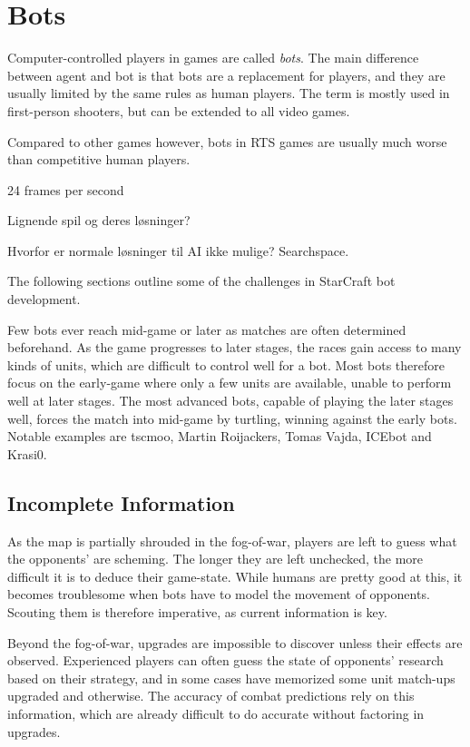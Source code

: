 \section{Bots}
Computer-controlled players in games are called \emph{bots}. The main difference between agent and bot is that bots are a replacement for players, and they are usually limited by the same rules as human players. The term is mostly used in first-person shooters, but can be extended to all video games.

Compared to other games however, bots in RTS games are usually much worse than competitive human players.

24 frames per second

Lignende spil og deres løsninger?

Hvorfor er normale løsninger til AI ikke mulige? Searchspace.

The following sections outline some of the challenges in StarCraft bot development.

Few bots ever reach mid-game or later as matches are often determined beforehand. As the game progresses to later stages, the races gain access to many kinds of units, which are difficult to control well for a bot. Most bots therefore focus on the early-game where only a few units are available, unable to perform well at later stages. The most advanced bots, capable of playing the later stages well, forces the match into mid-game by turtling, winning against the early bots. Notable examples are tscmoo, Martin Roijackers, Tomas Vajda, ICEbot and Krasi0.

	\subsection*{Incomplete Information}
	As the map is partially shrouded in the fog-of-war, players are left to guess what the opponents' are scheming. The longer they are left unchecked, the more difficult it is to deduce their game-state. While humans are pretty good at this, it becomes troublesome when bots have to model the movement of opponents. Scouting them is therefore imperative, as current information is key.
	
	Beyond the fog-of-war, upgrades are impossible to discover unless their effects are observed. Experienced players can often guess the state of opponents' research based on their strategy, and in some cases have memorized some unit match-ups upgraded and otherwise. The accuracy of combat predictions rely on this information, which are already difficult to do accurate without factoring in upgrades.
	
